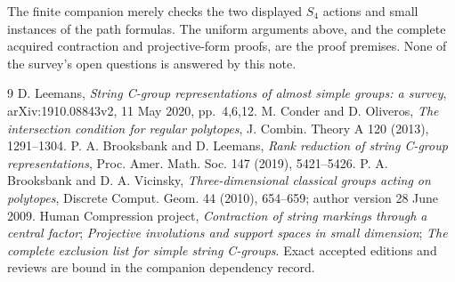 \documentclass[11pt,a4paper]{article}
\begin{document}
The finite companion merely checks the two displayed $S_4$ actions and
small instances of the path formulas. The uniform arguments above, and the
complete acquired contraction and projective-form proofs, are the proof
premises. None of the survey's open questions is answered by this note.
\begin{thebibliography}{9}
 D. Leemans, \emph{String C-group representations of almost
simple groups: a survey}, arXiv:1910.08843v2, 11 May 2020, pp.~4,6,12.
 M. Conder and D. Oliveros, \emph{The intersection condition for
regular polytopes}, J. Combin. Theory A 120 (2013), 1291--1304.
 P. A. Brooksbank and D. Leemans, \emph{Rank reduction of string
C-group representations}, Proc. Amer. Math. Soc. 147 (2019), 5421--5426.
 P. A. Brooksbank and D. A. Vicinsky, \emph{Three-dimensional
classical groups acting on polytopes}, Discrete Comput. Geom. 44 (2010),
654--659; author version 28 June 2009.
 Human Compression project, \emph{Contraction of string
markings through a central factor}; \emph{Projective involutions and support
spaces in small dimension}; \emph{The complete exclusion list for simple
string C-groups}. Exact accepted editions and reviews are bound in the
companion dependency record.
\end{thebibliography}
\end{document}
